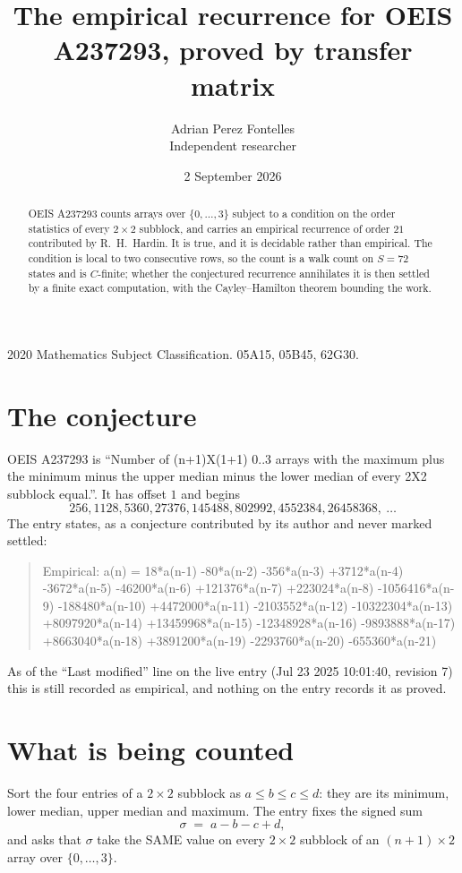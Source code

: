 \documentclass[11pt,a4paper]{article}
\title{The empirical recurrence for OEIS A237293, proved by transfer matrix}
\author{Adrian Perez Fontelles\\ \small Independent researcher}
\date{2 September 2026}
\theoremstyle{plain}
\theoremstyle{definition}
\begin{document}
\maketitle

\begin{abstract}
OEIS A237293 counts arrays over $\{0,\dots,3\}$ subject to a condition on the order
statistics of every $2\times2$ subblock, and carries an empirical recurrence of order
$21$ contributed by R.~H.~Hardin. It is true, and it is decidable rather than empirical.
The condition is local to two consecutive rows, so the count is a walk count on $S=72$
states and is $C$-finite; whether the conjectured recurrence annihilates it is then settled by
a finite exact computation, with the Cayley--Hamilton theorem bounding the work.
\end{abstract}

\noindent\small 2020 Mathematics Subject Classification. 05A15, 05B45, 62G30.\normalsize

\section{The conjecture}

OEIS A237293 is ``Number of (n+1)X(1+1) 0..3 arrays with the maximum plus the minimum minus the upper median minus the lower median of every 2X2 subblock equal.''. It has offset $1$ and begins
\[
256, 1128, 5360, 27376, 145488, 802992, 4552384, 26458368,\ \dots
\]
The entry states, as a conjecture contributed by its author and never marked settled:
\begin{quote}
Empirical: a(n) = 18*a(n-1) -80*a(n-2) -356*a(n-3) +3712*a(n-4) -3672*a(n-5) -46200*a(n-6) +121376*a(n-7) +223024*a(n-8) -1056416*a(n-9) -188480*a(n-10) +4472000*a(n-11) -2103552*a(n-12) -10322304*a(n-13) +8097920*a(n-14) +13459968*a(n-15) -12348928*a(n-16) -9893888*a(n-17) +8663040*a(n-18) +3891200*a(n-19) -2293760*a(n-20) -655360*a(n-21)
\end{quote}
As of the ``Last modified'' line on the live entry (Jul 23 2025 10:01:40, revision 7) this is still
recorded as empirical, and nothing on the entry records it as proved.

\section{What is being counted}

Sort the four entries of a $2\times2$ subblock as $a\le b\le c\le d$: they
are its minimum, lower median, upper median and maximum. The entry fixes the signed sum
\[
\sigma\;=\;a-b-c+d,
\]
and asks that $\sigma$ take the SAME value on every $2\times2$ subblock of an
$(n+1)\times2$ array over $\{0,\dots,3\}$.
\end{document}

